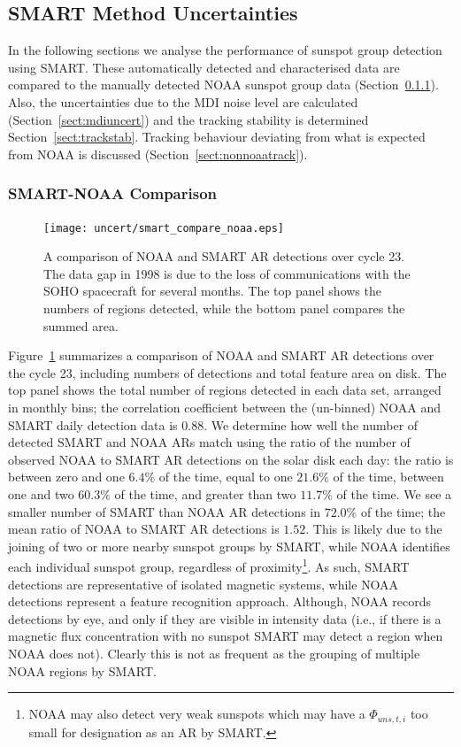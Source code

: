 \subsection{SMART Method Uncertainties}\label{sect:smartmethuncert}

In the following sections we analyse the performance of sunspot group detection using \gls{SMART}. These automatically detected and characterised data are compared to the manually detected \gls{NOAA} sunspot group data (Section~\ref{sect:noaacomp}). Also, the uncertainties due to the \gls{MDI} noise level are calculated (Section~\ref{sect:mdiuncert}) and the tracking stability is determined Section~\ref{sect:trackstab}. Tracking behaviour deviating from what is expected from \gls{NOAA} is discussed (Section~\ref{sect:nonnoaatrack}).

\subsubsection{SMART-NOAA Comparison}\label{sect:noaacomp}

\begin{figure}[!t]
\centerline{\texttt{[image: uncert/smart\_compare\_noaa.eps]}}
\caption[NOAA and SMART detections over cycle 23.]{A comparison of NOAA and SMART AR detections over cycle 23. The data gap in 1998 is due to the loss of communications with the SOHO spacecraft for several months. The top panel shows the numbers of regions detected, while the bottom panel compares the summed area.}
\label{noaa_comp}
\end{figure}

Figure~\ref{noaa_comp} summarizes a comparison of \gls{NOAA} and \gls{SMART} \gls{AR} detections over the cycle 23, including numbers of detections and total feature area on disk. The top panel shows the total number of regions detected in each data set, arranged in monthly bins; the correlation coefficient between the (un-binned) NOAA and SMART daily detection data is $0.88$. We determine how well the number of detected SMART and NOAA ARs match using the ratio of the number of observed \gls{NOAA} to \gls{SMART} \gls{AR} detections on the solar disk each day: the ratio is between zero and one $6.4\%$ of the time, equal to one $21.6\%$ of the time, between one and two $60.3\%$ of the time, and greater than two $11.7\%$ of the time. We see a smaller number of \gls{SMART} than \gls{NOAA} \gls{AR} detections in $72.0\%$ of the time; the mean ratio of \gls{NOAA} to \gls{SMART} \gls{AR} detections is $1.52$. This is likely due to the joining of two or more nearby sunspot groups by \gls{SMART}, while \gls{NOAA} identifies each individual sunspot group, regardless of proximity\footnote{NOAA may also detect very weak sunspots which may have a $\Phi_{uns,t,i}$ too small for designation as an \gls{AR} by \gls{SMART}.}. As such, \gls{SMART} detections are representative of isolated magnetic systems, while \gls{NOAA} detections represent a feature recognition approach. Although, \gls{NOAA} records detections by eye, and only if they are visible in intensity data (i.e., if there is a magnetic flux concentration with no sunspot \gls{SMART} may detect a region when \gls{NOAA} does not).  Clearly this is not as frequent as the grouping of multiple NOAA regions by SMART.

